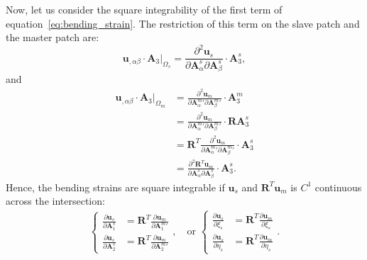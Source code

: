 \documentclass[preprint,12pt]{elsarticle}
\theoremstyle{remark}
\begin{document}
Now, let us consider the square integrability of the first term of equation~\eqref{eq:bending_strain}. The restriction of this term on the slave patch and the master patch are:
\begin{equation}
    \mathbf{u}_{,\alpha\beta}\cdot\mathbf{A}_3\vert_{\Omega_s}=\frac{\partial^2{}\mathbf{u}_s}{\partial{\mathbf{A}^s_\alpha}\partial{\mathbf{A}^s_\beta}}\cdot\mathbf{A}_3^s,
\end{equation}
and 
\begin{equation}
    \begin{split}
    \mathbf{u}_{,\alpha\beta}\cdot\mathbf{A}_3\vert_{\Omega_m}&=\frac{\partial^2{}\mathbf{u}_m}{\partial{{\mathbf{A}^m_\alpha}'}\partial{{\mathbf{A}^m_\beta}'}}\cdot\mathbf{A}_3^m\\
    &=\frac{\partial^2{}\mathbf{u}_m}{\partial{{\mathbf{A}^m_\alpha}'}\partial{{\mathbf{A}^m_\beta}'}}\cdot\mathbf{R}\mathbf{A}_3^s\\
    &=\mathbf{R}^T\frac{\partial^2{}\mathbf{u}_m}{\partial{{\mathbf{A}^m_\alpha}'}\partial{{\mathbf{A}^m_\beta}'}}\cdot\mathbf{A}_3^s\\
    &=\frac{\partial^2{}\mathbf{R}^T\mathbf{u}_m}{\partial{\mathbf{A}^s_\alpha}\partial{\mathbf{A}^s_\beta}}\cdot\mathbf{A}_3^s.
    \end{split}
\end{equation}
Hence, the bending strains are square integrable if $\mathbf{u}_s$ and $\mathbf{R}^T\mathbf{u}_m$ is $C^1$ continuous across the intersection:
\begin{gather}
    \begin{cases}
        \frac{\partial{\mathbf{u}_s}}{\partial{\mathbf{A}_1^s}}&=\mathbf{R}^T\frac{\partial{\mathbf{u}_m}}{\partial{\mathbf{A}_1^m}'}\\
        \frac{\partial{\mathbf{u}_s}}{\partial{\mathbf{A}_2^s}}&=\mathbf{R}^T\frac{\partial{\mathbf{u}_m}}{\partial{\mathbf{A}_2^m}'}
    \end{cases},\quad\text{or }
    \begin{cases}
        \frac{\partial{\mathbf{u}_s}}{\partial{\xi_s}}&=\mathbf{R}^T\frac{\partial{\mathbf{u}_m}}{\partial{\xi_s}}\\
        \frac{\partial{\mathbf{u}_s}}{\partial{\eta_s}}&=\mathbf{R}^T\frac{\partial{\mathbf{u}_m}}{\partial{\eta_s}}
    \end{cases}.\label{eq:kl-shell-constraints}
\end{gather}
\end{document}
